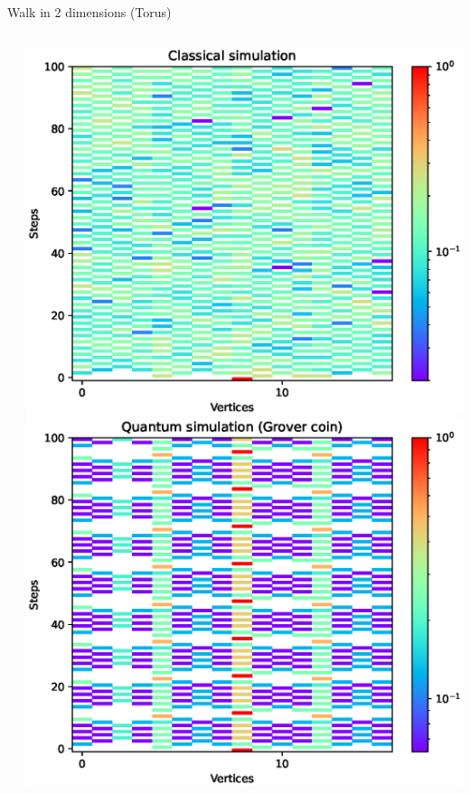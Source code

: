 \documentclass[aspectratio=169]{beamer}
\begin{document}
\begin{frame}{Walk in 2 dimensions (Torus)}
  \begin{columns}[onlytextwidth]
    \begin{column}{.20\textwidth}
    \end{column}
    \begin{column}{.30\textwidth}
      \includegraphics[width=\textwidth]{./figures/results/grid_horizontal_vertical/classical.eps}
      \vspace{-1em} %
      \includegraphics[width=\textwidth]{./figures/results/grid_horizontal_vertical/grover.eps}

\end{column}
\end{columns}
\end{frame}
\end{document}
